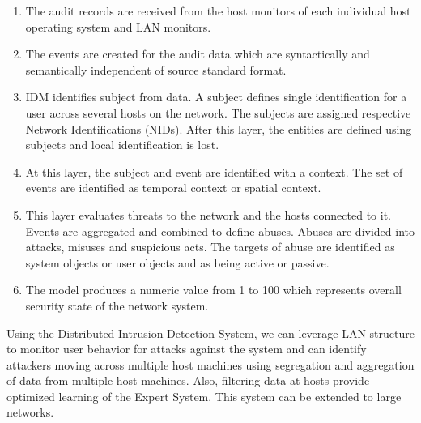 \documentclass[11pt]{article}
\begin{document}
	\begin{enumerate}
		\item The audit records are received from the host monitors of each individual host operating system and LAN monitors.
		\item The events are created for the audit data which are syntactically and semantically independent of source standard format.
		\item IDM identifies subject from data. A subject defines single identification for a user across several hosts on the network. The subjects are assigned respective Network Identifications (NIDs). After this layer, the entities are defined using subjects and local identification is lost.
		\item At this layer, the subject and event are identified with a context. The set of events are identified as temporal context or spatial context.
		\item This layer evaluates threats to the network and the hosts connected to it. Events are aggregated and combined to define abuses. Abuses are divided into attacks, misuses and suspicious acts. The targets of abuse are identified as system objects or user objects and as being active or passive.
		\item The model produces a numeric value from 1 to 100 which represents overall security state of the network system.
	\end{enumerate}
	Using the Distributed Intrusion Detection System, we can leverage LAN structure to monitor user behavior for attacks against the system and can identify attackers moving across multiple host machines using segregation and aggregation of data from multiple host machines. Also, filtering data at hosts provide optimized learning of the Expert System. This system can be extended to large networks.
\end{document}

